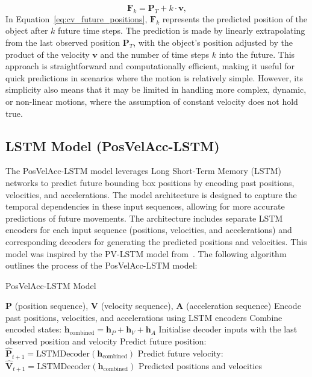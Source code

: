 \documentclass[12pt,oneside]{book} %
\begin{document}
\begin{equation}
    \mathbf{F}_k = \mathbf{P}_T + k \cdot \mathbf{v}, \label{eq:cv_future_positions}
\end{equation}
In Equation~\eqref{eq:cv_future_positions}, $\mathbf{F}_k$ represents the predicted position of the object after $k$ future time steps. The prediction is made by linearly extrapolating from the last observed position $\mathbf{P}_T$, with the object's position adjusted by the product of the velocity $\mathbf{v}$ and the number of time steps $k$ into the future. This approach is straightforward and computationally efficient, making it
useful for quick predictions in scenarios where the motion is relatively
simple. However, its simplicity also means that it may be limited in handling
more complex, dynamic, or non-linear motions, where the assumption of constant
velocity does not hold true.

\newpage
\subsection*{LSTM Model (PosVelAcc-LSTM)}
\noindent The PosVelAcc-LSTM model leverages Long Short-Term Memory (LSTM) networks to predict future bounding box positions by encoding past positions, velocities, and accelerations. The model architecture is designed to capture the temporal dependencies in these input sequences, allowing for more accurate predictions of future movements. The architecture includes separate LSTM encoders for each input sequence (positions, velocities, and accelerations) and corresponding decoders for generating the predicted positions and velocities. This model was inspired by the PV-LSTM model from~\citet{DBLP:journals/corr/abs-2010-10270}. The following algorithm outlines the process of the PosVelAcc-LSTM model:

\begin{algorithm}[H]
    \caption{PosVelAcc-LSTM Model}\label{alg:lstm_posvelacc}
    \begin{algorithmic}[1]
        \Require $\mathbf{P}$ (position sequence), $\mathbf{V}$ (velocity sequence), $\mathbf{A}$ (acceleration sequence)
        \State Encode past positions, velocities, and accelerations using LSTM encoders
        \State Combine encoded states: $\mathbf{h}_{\text{combined}} = \mathbf{h}_P + \mathbf{h}_V + \mathbf{h}_A$
        \State Initialise decoder inputs with the last observed position and velocity
         
        \State Predict future position: $\hat{\mathbf{P}}_{t+1} = \text{LSTMDecoder}(\mathbf{h}_{\text{combined}})$
        \State Predict future velocity: $\hat{\mathbf{V}}_{t+1} = \text{LSTMDecoder}(\mathbf{h}_{\text{combined}})$
        \EndFor
        \State \Return Predicted positions and velocities
    \end{algorithmic}
\end{algorithm}
\end{document}
